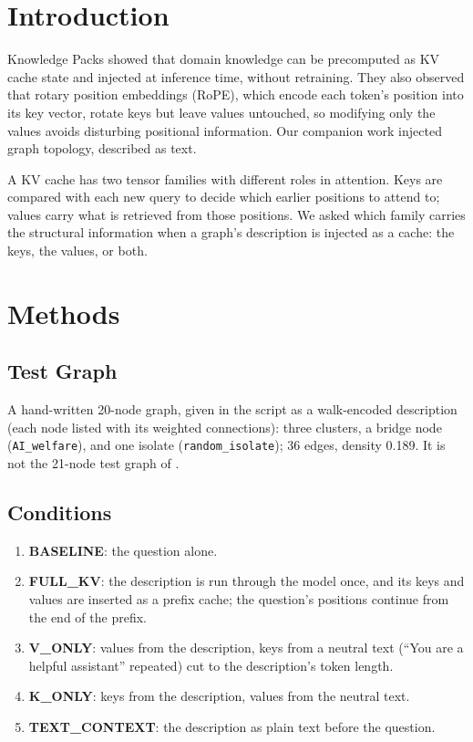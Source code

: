 \documentclass[11pt,a4paper]{article}
\begin{document}
\section{Introduction}

Knowledge Packs \citep{pustovit2026knowledge} showed that domain knowledge can be precomputed as KV cache state and injected at inference time, without retraining. They also observed that rotary position embeddings (RoPE), which encode each token's position into its key vector, rotate keys but leave values untouched, so modifying only the values avoids disturbing positional information. Our companion work \citep{nexus2026topology} injected graph topology, described as text.

A KV cache has two tensor families with different roles in attention. Keys are compared with each new query to decide which earlier positions to attend to; values carry what is retrieved from those positions. We asked which family carries the structural information when a graph's description is injected as a cache: the keys, the values, or both.

\section{Methods}

\subsection{Test Graph}

A hand-written 20-node graph, given in the script as a walk-encoded description (each node listed with its weighted connections): three clusters, a bridge node (\texttt{AI\_welfare}), and one isolate (\texttt{random\_isolate}); 36 edges, density 0.189. It is not the 21-node test graph of \citet{nexus2026topology}.

\subsection{Conditions}
\label{sec:conditions}

\begin{enumerate}
    \item \textbf{BASELINE}: the question alone.
    \item \textbf{FULL\_KV}: the description is run through the model once, and its keys and values are inserted as a prefix cache; the question's positions continue from the end of the prefix.
    \item \textbf{V\_ONLY}: values from the description, keys from a neutral text (``You are a helpful assistant'' repeated) cut to the description's token length.
    \item \textbf{K\_ONLY}: keys from the description, values from the neutral text.
    \item \textbf{TEXT\_CONTEXT}: the description as plain text before the question.
\end{enumerate}
\end{document}
